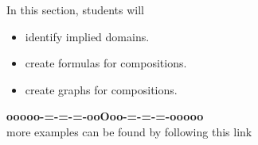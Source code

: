 \documentclass{ximera}
\begin{document}
\begin{sectionOutcomes}
In this section, students will 

\begin{itemize}
\item identify implied domains.
\item create formulas for compositions.
\item create graphs for compositions.
\end{itemize}
\end{sectionOutcomes}















\begin{center}
\textbf{\textcolor{green!50!black}{ooooo-=-=-=-ooOoo-=-=-=-ooooo}} \\

more examples can be found by following this link\\ 

\end{center}
\end{document}
